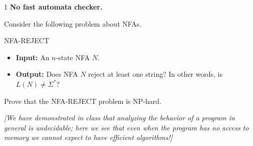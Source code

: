\documentclass[12pt]{article}
\begin{document}


\begin{problem}{1}
\textbf{No fast automata checker.} 

    Consider the following problem about NFAs.

    \begin{tcolorbox}
    \textsc{NFA-REJECT}
    \begin{itemize}
        \item \textbf{Input:} An $n$-state NFA $N$.
        \item \textbf{Output:} Does NFA $N$ reject at least one string? In other words, is $L(N) \neq \Sigma^*$?
    \end{itemize}
    \end{tcolorbox}

    Prove that the \textsc{NFA-REJECT} problem is NP-hard.

    \emph{[We have demonstrated in class that analyzing the behavior of a program in general is undecidable; here we see that even when the program has no access to memory we cannot expect to have efficient algorithms!]}
\end{problem}
\end{document}
